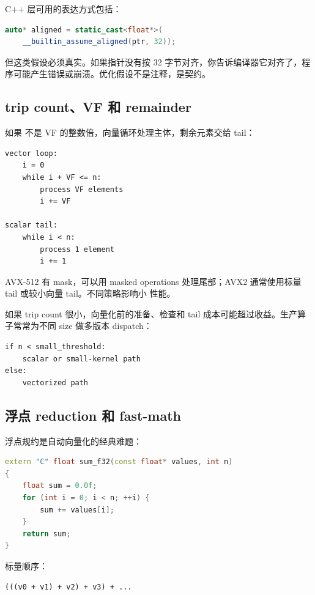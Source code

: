 C++ 层可用的表达方式包括：

\begin{lstlisting}[language=C++]
auto* aligned = static_cast<float*>(
    __builtin_assume_aligned(ptr, 32));
\end{lstlisting}

但这类假设必须真实。如果指针没有按 32 字节对齐，你告诉编译器它对齐了，程序可能产生错误或崩溃。优化假设不是注释，是契约。

\subsection{trip count、VF 和 remainder}

如果  不是 VF 的整数倍，向量循环处理主体，剩余元素交给 tail：

\begin{lstlisting}
vector loop:
    i = 0
    while i + VF <= n:
        process VF elements
        i += VF

scalar tail:
    while i < n:
        process 1 element
        i += 1
\end{lstlisting}

AVX-512 有 mask，可以用 masked operations 处理尾部；AVX2 通常使用标量 tail 或较小向量 tail。不同策略影响小  性能。

如果 trip count 很小，向量化前的准备、检查和 tail 成本可能超过收益。生产算子常常为不同 size 做多版本 dispatch：

\begin{lstlisting}
if n < small_threshold:
    scalar or small-kernel path
else:
    vectorized path
\end{lstlisting}

\subsection{浮点 reduction 和 fast-math}

浮点规约是自动向量化的经典难题：

\begin{lstlisting}[language=C++]
extern "C" float sum_f32(const float* values, int n)
{
    float sum = 0.0f;
    for (int i = 0; i < n; ++i) {
        sum += values[i];
    }
    return sum;
}
\end{lstlisting}

标量顺序：

\begin{lstlisting}
(((v0 + v1) + v2) + v3) + ...
\end{lstlisting}

